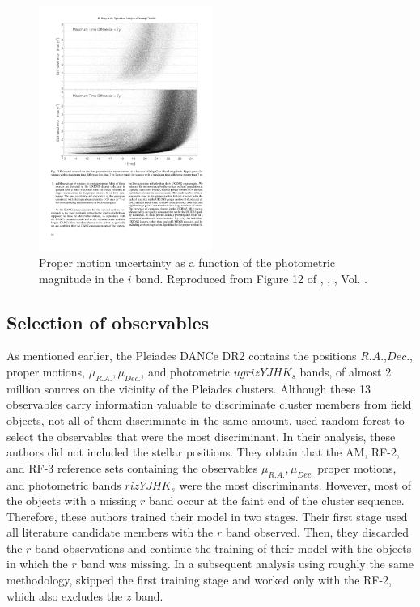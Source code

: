 \begin{figure}[ht!]
\begin{center}
\includegraphics[height=8cm]{background/Figures/F12_Bouy2013.pdf}
\caption{Proper motion uncertainty as a function of the photometric magnitude in the $i$ band. Reproduced from Figure 12 of \citet{Bouy2013}, \textit{}, , Vol. .}
\label{fig:pmuncert}
\end{center}
\end{figure}

\subsection{Selection of observables}
\label{sect:RF-2}
\sloppy
As mentioned earlier, the Pleiades DANCe DR2 contains the positions $R.A.$,$Dec.$, proper motions, $\mu_{R.A.},\mu_{Dec.}$, and photometric $ugrizYJHK_s$ bands, of almost 2 million sources on the vicinity of the Pleiades clusters. Although these 13 observables carry information valuable to discriminate cluster members from field objects, not all of them discriminate in the same amount. \citet{Sarro2014} used random forest to select the observables that were the most discriminant. In their analysis, these authors did not included the stellar positions. They obtain that the AM, RF-2, and RF-3 reference sets containing the observables $\mu_{R.A.},\mu_{Dec.}$ proper motions, and photometric bands $rizYJHK_s$ were the most discriminants. {However, most of the objects with a missing $r$ band occur at the faint end of the cluster sequence. Therefore, these authors trained their model in two stages. Their first stage used all literature candidate members with the $r$ band observed. Then, they discarded the $r$ band observations and continue the training of their model with the objects in which the $r$ band was missing.} In a subsequent analysis using roughly the same methodology, \citet{Bouy2015} skipped the first training stage and worked only with the RF-2, which also excludes the $z$ band.

